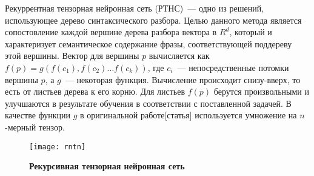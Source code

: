 Рекуррентная тензорная нейронная сеть (РТНС)~--- одно из решений, использующее дерево синтаксического разбора. Целью данного метода является сопостовление каждой вершине дерева разбора вектора в $R^d$, 
который и характеризует семантическое содержание фразы, соответствующей поддереву этой вершины.
Вектор для вершины $p$ вычисляется как $f(p)=g(f(c_1), f(c_2) \dots{} f(c_k))$, где $c_i$~--- непосредственные потомки вершины $p$, а $g$~--- некоторая функция. Вычисление происходит снизу-вверх, то
есть от листьев дерева к его корню. Для листьев $f(p)$ берутся произвольными и улучшаются в результате обучения в соответствии с поставленной задачей.
В качестве функции $g$ в оригинальной работе[статья] используется умножение на $n$-мерный тензор.

\begin{figure}[h]
\texttt{[image: rntn]}
\caption{\textbf{Рекурсивная тензорная нейронная сеть}}
\label{fig:rntn}
\end{figure}
 